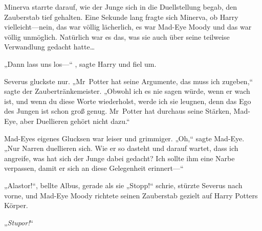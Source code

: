 \later

Minerva starrte darauf, wie der Junge sich in die Duellstellung begab, den Zauberstab tief gehalten. Eine Sekunde lang fragte sich Minerva, ob Harry vielleicht—nein, das war völlig lächerlich, es war Mad-Eye Moody und das war völlig unmöglich. Natürlich war es das, was sie auch über seine teilweise Verwandlung gedacht hatte…

„Dann lass uns los—“ , sagte Harry und fiel um.

Severus gluckste nur. „Mr~Potter hat seine Argumente, das muss ich zugeben,“ sagte der Zaubertränkemeister. „Obwohl ich es nie sagen würde, wenn er wach ist, und wenn du diese Worte wiederholst, werde ich sie leugnen, denn das Ego des Jungen ist schon groß genug. Mr~Potter hat durchaus seine Stärken, Mad-Eye, aber Duellieren gehört nicht dazu.“

Mad-Eyes eigenes Glucksen war leiser und grimmiger. „Oh,“ sagte Mad-Eye. „Nur Narren duellieren sich. Wie er so dasteht und darauf wartet, dass ich angreife, was hat sich der Junge dabei gedacht? Ich sollte ihm eine Narbe verpassen, damit er sich an diese Gelegenheit erinnert—“

„Alastor!“, bellte Albus, gerade als sie „Stopp!“ schrie, stürzte Severus nach vorne, und Mad-Eye Moody richtete seinen Zauberstab gezielt auf Harry Potters Körper.

„\emph{Stupor!}“

